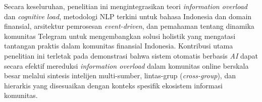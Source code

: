 Secara keseluruhan, penelitian ini mengintegrasikan teori \textit{information overload} dan \textit{cognitive load}, metodologi NLP terkini untuk bahasa Indonesia dan domain finansial, arsitektur pemrosesan \textit{event-driven}, dan pemahaman tentang dinamika komunitas Telegram untuk mengembangkan solusi holistik yang mengatasi tantangan praktis dalam komunitas finansial Indonesia. Kontribusi utama penelitian ini terletak pada demonstrasi bahwa sistem otomatis berbasis \textit{AI} dapat secara efektif mereduksi \textit{information overload} dalam komunitas online berskala besar melalui sintesis intelijen multi-sumber, lintas-grup (\textit{cross-group}), dan hierarkis yang disesuaikan dengan konteks spesifik ekosistem informasi komunitas.
